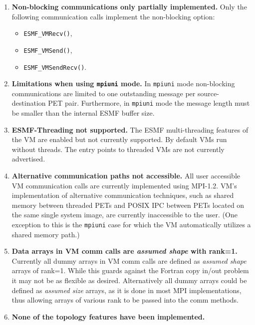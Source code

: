 

\begin{enumerate}

\item {\bf Non-blocking communications only partially implemented.} Only the following communication calls implement the non-blocking option:
\begin{itemize}
\item {\tt ESMF\_VMRecv()},
\item {\tt ESMF\_VMSend()},
\item {\tt ESMF\_VMSendRecv()}.
\end{itemize}

\item {\bf Limitations when using {\tt mpiuni} mode.} In {\tt mpiuni} mode non-blocking communications are limited to one outstanding message per source-destination PET pair. Furthermore, in {\tt mpiuni} mode the message length must be smaller than the internal ESMF buffer size.

\item {\bf ESMF-Threading not supported.} The ESMF multi-threading features of the VM are enabled but not currently supported. By default VMs run without threads. The entry points to threaded VMs are not currently advertised.

\item {\bf Alternative communication paths not accessible.} All user accessible VM communication calls are currently implemented using MPI-1.2. VM's implementation of alternative communication techniques, such as shared memory between threaded PETs and POSIX IPC between PETs located on the same single system image, are currently inaccessible to the user. (One exception to this is the {\tt mpiuni} case for which the VM automatically utilizes a shared memory path.)

\item {\bf Data arrays in VM comm calls are {\em assumed shape} with rank=1.} Currently all dummy arrays in VM comm calls are defined as {\em assumed shape} arrays of rank=1. While this guards against the Fortran copy in/out problem it may not be as flexible as desired. Alternatively all dummy arrays could be defined as {\em assumed size} arrays, as it is done in most MPI implementations, thus allowing arrays of various rank to be passed into the comm methods.

\item {\bf None of the topology features have been implemented.}

\end{enumerate}


